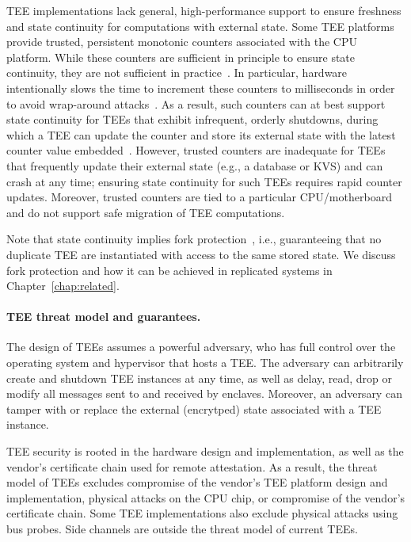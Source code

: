 \ac{TEE} implementations lack general, high-performance support to ensure
freshness and state continuity for computations with external state.
Some \ac{TEE} platforms provide trusted, persistent monotonic counters
associated with the CPU platform. While these counters are sufficient
in principle to ensure state continuity, they are not sufficient in
practice~\cite{ariadne}.  In particular, hardware intentionally slows
the time to increment these counters to milliseconds in order to avoid
wrap-around attacks~\cite{ariadne,rote}.  As a result, such counters
can at best support state continuity for \acp{TEE} that exhibit infrequent,
orderly shutdowns, during which a \ac{TEE} can update the counter and store
its external state with the latest counter value
embedded~\cite{ariadne}.  However, trusted counters are inadequate for
\acp{TEE} that frequently update their external state (e.g., a database or
\ac{KVS}) and can crash at any time; ensuring state continuity
for such \acp{TEE} requires rapid counter updates.  Moreover, trusted
counters are tied to a particular CPU/motherboard and do not support
safe migration of \ac{TEE} computations.

Note that state continuity implies fork
protection~\cite{fork_lcm}, i.e., guaranteeing that no duplicate
\ac{TEE} are instantiated with access to the same stored state.  We
discuss fork protection and how it can be achieved in replicated
systems in Chapter~\ref{chap:related}.

\paragraph{\ac{TEE} threat model and guarantees.}

The design of \acp{TEE} assumes a powerful adversary, who has full
control over the operating system and hypervisor that hosts a \ac{TEE}.
The adversary can arbitrarily create and shutdown \ac{TEE} instances at
any time, as well as delay, read, drop or modify all messages sent
to and received by enclaves.  Moreover, an adversary can tamper with
or replace the external (encrytped) state associated with a \ac{TEE}
instance.

\ac{TEE} security is rooted in the hardware design and implementation, as
well as the vendor's certificate chain used for remote attestation. As
a result, the threat model of \acp{TEE} excludes compromise of the vendor's
\ac{TEE} platform design and implementation, physical attacks on the CPU
chip, or compromise of the vendor's certificate chain.  Some \ac{TEE}
implementations also exclude physical attacks using bus probes.  Side
channels are outside the threat model of current \acp{TEE}.

